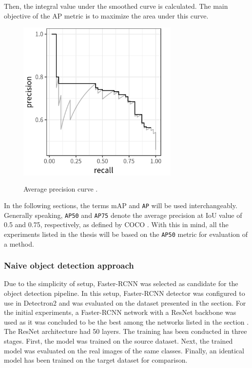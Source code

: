 \FloatBarrier
Then, the integral value under the smoothed curve is calculated. The main objective of the AP  metric is to maximize the area under this curve.

\begin{figure}[htb]
	\begin{center}
		\includegraphics[width=8cm]{./AUC.png}
	\end{center}
	\caption{Average precision curve \cite{mAp_blog}.}
	\begin{center}
		\label{AUC}
	\end{center}
\end{figure}

In the following sections, the terms mAP and \texttt{AP} will be used interchangeably. Generally speaking, \texttt{AP50} and \texttt{AP75} denote the average precision at IoU value of 0.5 and 0.75, respectively, as defined by COCO \cite{Lin2014}. With this in mind, all the experiments listed in the thesis will be based on the \texttt{AP50} metric for evaluation of a method.   
\FloatBarrier


\subsubsection{Naive object detection approach}
\label{naive} 
Due to the simplicity of setup, Faster-RCNN \cite{ima} was selected as  candidate for the object detection pipeline. In this setup, Faster-RCNN detector was configured to use in Detectron2  \cite{wu2019Detectron2} and was evaluated on the  dataset presented in the  section. For the initial experiments, a Faster-RCNN network with a ResNet backbone was used as it was concluded to be the best among the networks listed in the section . The ResNet architecture had 50 layers. The training has been conducted in three stages. First, the model was trained on the source dataset. Next, the trained model was evaluated on the real images of the same classes. Finally, an identical model has been trained on the target dataset for comparison. 

